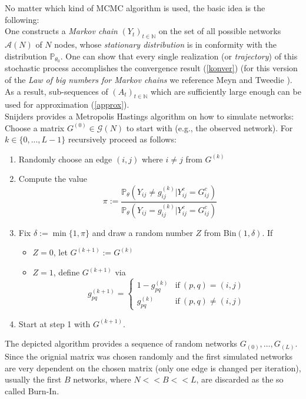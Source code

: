 \documentclass[headsepline=true, abstracton]{scrartcl}
\begin{document}
No matter which kind of MCMC algorithm is used, the basic idea is the following:
\\One constructs a \textit{Markov chain} $(Y_t)_{t \in \mathbb{N}}$ on the set of all possible networks $\mathcal{A}(N)$ of $N$ nodes, whose \textit{stationary distribution} is in conformity with the distribution $\mathbb{P}_{\theta_0}$. One can show that every single realization (or \textit{trajectory}) 
of this stochastic process accomplishes the convergence result (\ref{konver}) (for this version of the \textit{Law of big numbers for Markov chains} we reference Meyn and Tweedie \cite{Meyn.2009}). As a result, sub-sequences of $(A_t)_{t \in \mathbb{N}}$ which are sufficiently large enough can be used for approximation (\ref{approx}).\\[0.3cm]
Snijders \cite{Snijders.2002b} provides a Metropolis Hastings algorithm on how to simulate networks:
Choose a matrix $G^{(0)} \in \mathcal{G}(N)$ to start with (e.g., the observed network). For $k \in \{0,...,L-1\}$ recursively proceed as follows:\\
\begin{enumerate}
\item Randomly choose an edge $(i,j)$ where $i \neq j$ from $G^{(k)}$
\item Compute the value
$$\pi := \dfrac{\mathbb{P}_{\theta}(Y_{ij} \neq g_{ij}^{(k)} | Y_{ij}^c=G_{ij}^c)}{\mathbb{P}_{\theta}(Y_{ij}= g_{ij}^{(k)} | Y_{ij}^c=G_{ij}^c)}$$
\item Fix $\delta:= \min\{1, \pi\}$ and draw a random number $Z$ from Bin$(1, \delta)$. If
\begin{itemize}
\item $Z=0$, let $G^{(k+1)} := G^{(k)}$ 
\item $Z=1$, define $G^{(k+1)}$ via
$$g_{pq}^{(k+1)}=\begin{cases}
1-g_{pq}^{(k)}& \text{if}~ (p,q)=(i,j) \\
g_{pq}^{(k)} &\text{if}~ (p,q) \neq (i,j) 
\end{cases}$$
\end{itemize}
\item Start at step 1 with $G^{(k+1)}$.
\end{enumerate}
The depicted algorithm provides a sequence of random networks $G_(0),\dots,G_(L)$. Since the orignial matrix was chosen randomly and the first simulated networks are very dependent on the chosen matrix (only one edge is changed per iteration), usually
the first $B$ networks, where $N << B << L$, are discarded as the so called Burn-In.
\end{document}
